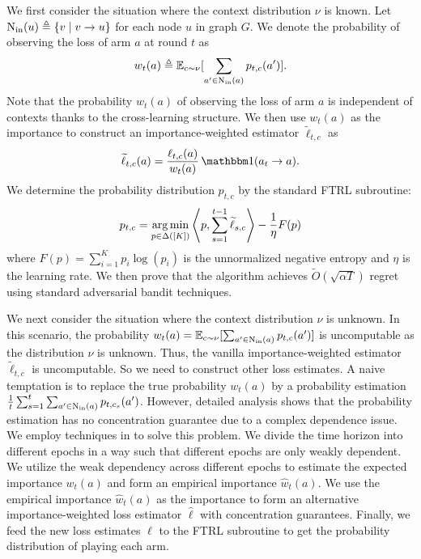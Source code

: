 We first consider the situation where the context distribution $\nu$ is known.
%
Let $\operatorname{N_{\text{in}}}(u) \triangleq \{ v \mid v \rightarrow u\}$ for each node $u$ in graph $G$.
We denote the probability of observing the loss of arm $a$ at round $t$ as
\[w_t(a) \triangleq \mathbb{E}_{c \sim \nu}[\sum_{a^{\prime} \in \operatorname{N_{\text{in}}}(a)} p_{t,c}(a^{\prime})].\]
%
Note that the probability $w_t(a)$ of observing the loss of arm $a$ is independent of contexts thanks to the cross-learning structure.
%
We then use $w_t(a)$ as the importance to construct an importance-weighted estimator $\widetilde{\ell}_{t,c}$ as
\[\widetilde{\ell}_{t,c}(a) = \frac{\ell_{t,c}(a)}{w_t(a)} \indi(a_t \rightarrow a).\]
We determine the probability distribution $p_{t,c}$ by the standard FTRL subroutine:
\[p_{t,c} = \operatorname*{arg\,min}_{p \in \Delta([K])} \left\langle p, \sum_{s=1}^{t-1} \widetilde{\ell}_{s,c} \right\rangle - \frac{1}{\eta} F(p)\]
where $F(p) = \sum_{i=1}^K p_i \log(p_i)$ is the unnormalized negative entropy and $\eta$ is the learning rate.
%
We then prove that the algorithm achieves $\widetilde{O}(\sqrt{\alpha T})$ regret using standard adversarial bandit techniques.

We next  consider the situation where the context distribution $\nu$ is unknown.   
%
In this scenario, the probability $w_t(a) = \mathbb{E}_{c \sim \nu}[\sum_{a^{\prime} \in \operatorname{N_{\text{in}}}(a)} p_{t,c}(a^{\prime})]$ is uncomputable as the distribution $\nu$ is unknown.
%
Thus, the vanilla importance-weighted estimator $\widetilde{\ell}_{t,c}$ is uncomputable.
%
So we need to construct other loss estimates.
%
A naive temptation is to replace the true probability $w_t(a)$ by a probability estimation $\frac{1}{t} \sum_{s=1}^t \sum_{a^{\prime} \in \operatorname{N_{\text{in}}}(a)} p_{t,c_s}(a^{\prime})$.
%
However, detailed analysis shows that the probability estimation has no concentration guarantee due to a complex dependence issue.
%
We employ techniques in \citet{Sch23} to solve this problem.
%
We divide the time horizon into different epochs in a way such that different epochs are only weakly dependent. 
%
We utilize the weak dependency across different epochs to estimate the expected importance $w_t(a)$ and form an empirical importance $\widehat{w}_t(a)$.
%
We use the empirical importance $\widehat{w}_t(a)$ as the importance to form an alternative importance-weighted loss estimator $\widehat{\ell}$ with concentration guarantees.
%
Finally, we feed the new loss estimates $\widehat{\ell}$ to the FTRL subroutine to get the probability distribution of playing each arm.


